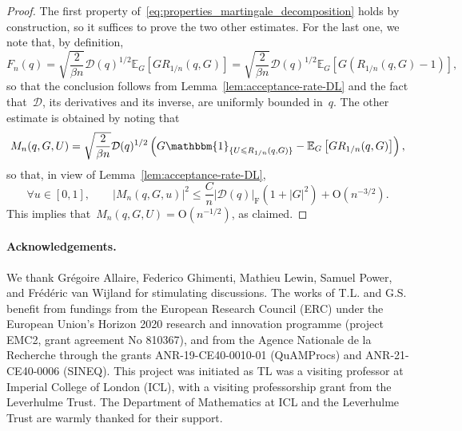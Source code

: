 \documentclass{article}
\renewcommand{\leq}{\leqslant}
\def\E{\mathbb{E}} %
\newcommand{\Diff}{\mathcal{D}}
\newcommand{\F}{\mathrm{F}}
\newcommand{\normF}[1]{\left| #1 \right|_{\F}}
\begin{document}
\begin{proof}
  The first property of~\eqref{eq:properties_martingale_decomposition} holds by construction, so it suffices to prove the two other estimates. For the last one, we note that, by definition, 
  \[
  F_n(q) = \sqrt{\frac{2}{\beta n}}\Diff(q)^{1/2} \E_G\left[ G R_{1/n}(q,G) \right] = \sqrt{\frac{2}{\beta n}}\Diff(q)^{1/2} \E_G\left[ G \left(R_{1/n}(q,G)-1\right) \right],
  \]
  so that the conclusion follows from Lemma~\ref{lem:acceptance-rate-DL} and the fact that~$\Diff$, its derivatives and its inverse, are uniformly bounded in~$q$. The other estimate is obtained by noting that 
\[
M_n(q, G, U) = \sqrt{\frac{2}{\beta n}} \Diff(q)^{1/2} \left( G\mathbbm{1}_{\{U\leq R_{1/n}(q,G)\}} - \E_G\left[ G R_{1/n}(q,G) \right]\right),
\]
so that, in view of Lemma~\ref{lem:acceptance-rate-DL}, 
\[
\forall u \in [0,1], \qquad |M_n(q, G, u)|^2 \leq \frac{C}{n} \normF{\Diff(q)} \left(1+|G|^2\right) + \mathrm{O}(n^{-3/2}). 
\]
This implies that~$M_n(q, G, U) = \mathrm{O}(n^{-1/2})$, as claimed. 
\end{proof}


\paragraph{Acknowledgements.}
We thank Grégoire Allaire, Federico Ghimenti, Mathieu Lewin, Samuel Power, and Frédéric van Wijland for stimulating discussions. The works of T.L. and G.S. benefit from fundings from the European Research Council (ERC) under the European Union's Horizon 2020 research and innovation programme (project EMC2, grant agreement No 810367), and from the Agence Nationale de la Recherche through the grants ANR-19-CE40-0010-01 (QuAMProcs) and ANR-21-CE40-0006 (SINEQ). This project was initiated as TL was a visiting professor at Imperial College of London (ICL), with a visiting professorship grant from the Leverhulme Trust. The Department of Mathematics at ICL and the Leverhulme Trust are warmly thanked for their support. 



\end{document}
